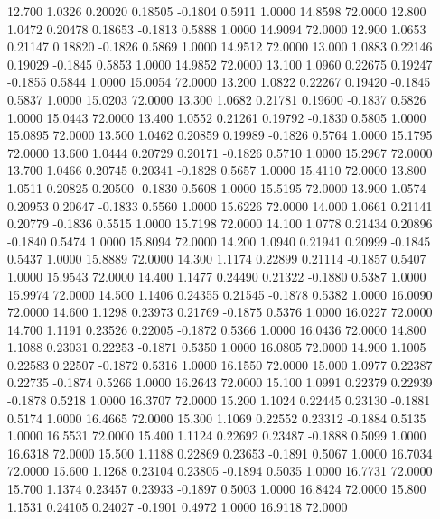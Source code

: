   12.700   1.0326   0.20020   0.18505  -0.1804   0.5911   1.0000  14.8598  72.0000
  12.800   1.0472   0.20478   0.18653  -0.1813   0.5888   1.0000  14.9094  72.0000
  12.900   1.0653   0.21147   0.18820  -0.1826   0.5869   1.0000  14.9512  72.0000
  13.000   1.0883   0.22146   0.19029  -0.1845   0.5853   1.0000  14.9852  72.0000
  13.100   1.0960   0.22675   0.19247  -0.1855   0.5844   1.0000  15.0054  72.0000
  13.200   1.0822   0.22267   0.19420  -0.1845   0.5837   1.0000  15.0203  72.0000
  13.300   1.0682   0.21781   0.19600  -0.1837   0.5826   1.0000  15.0443  72.0000
  13.400   1.0552   0.21261   0.19792  -0.1830   0.5805   1.0000  15.0895  72.0000
  13.500   1.0462   0.20859   0.19989  -0.1826   0.5764   1.0000  15.1795  72.0000
  13.600   1.0444   0.20729   0.20171  -0.1826   0.5710   1.0000  15.2967  72.0000
  13.700   1.0466   0.20745   0.20341  -0.1828   0.5657   1.0000  15.4110  72.0000
  13.800   1.0511   0.20825   0.20500  -0.1830   0.5608   1.0000  15.5195  72.0000
  13.900   1.0574   0.20953   0.20647  -0.1833   0.5560   1.0000  15.6226  72.0000
  14.000   1.0661   0.21141   0.20779  -0.1836   0.5515   1.0000  15.7198  72.0000
  14.100   1.0778   0.21434   0.20896  -0.1840   0.5474   1.0000  15.8094  72.0000
  14.200   1.0940   0.21941   0.20999  -0.1845   0.5437   1.0000  15.8889  72.0000
  14.300   1.1174   0.22899   0.21114  -0.1857   0.5407   1.0000  15.9543  72.0000
  14.400   1.1477   0.24490   0.21322  -0.1880   0.5387   1.0000  15.9974  72.0000
  14.500   1.1406   0.24355   0.21545  -0.1878   0.5382   1.0000  16.0090  72.0000
  14.600   1.1298   0.23973   0.21769  -0.1875   0.5376   1.0000  16.0227  72.0000
  14.700   1.1191   0.23526   0.22005  -0.1872   0.5366   1.0000  16.0436  72.0000
  14.800   1.1088   0.23031   0.22253  -0.1871   0.5350   1.0000  16.0805  72.0000
  14.900   1.1005   0.22583   0.22507  -0.1872   0.5316   1.0000  16.1550  72.0000
  15.000   1.0977   0.22387   0.22735  -0.1874   0.5266   1.0000  16.2643  72.0000
  15.100   1.0991   0.22379   0.22939  -0.1878   0.5218   1.0000  16.3707  72.0000
  15.200   1.1024   0.22445   0.23130  -0.1881   0.5174   1.0000  16.4665  72.0000
  15.300   1.1069   0.22552   0.23312  -0.1884   0.5135   1.0000  16.5531  72.0000
  15.400   1.1124   0.22692   0.23487  -0.1888   0.5099   1.0000  16.6318  72.0000
  15.500   1.1188   0.22869   0.23653  -0.1891   0.5067   1.0000  16.7034  72.0000
  15.600   1.1268   0.23104   0.23805  -0.1894   0.5035   1.0000  16.7731  72.0000
  15.700   1.1374   0.23457   0.23933  -0.1897   0.5003   1.0000  16.8424  72.0000
  15.800   1.1531   0.24105   0.24027  -0.1901   0.4972   1.0000  16.9118  72.0000

